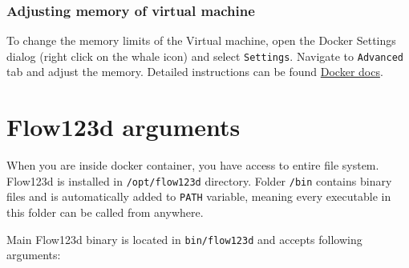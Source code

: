 \subsubsection{Adjusting memory of virtual machine}
To change the memory limits of the Virtual machine, open the Docker Settings dialog (right click on the whale icon) and select \verb'Settings'.
Navigate to \verb'Advanced' tab and adjust the memory. Detailed instructions can be found \href{https://docs.docker.com/docker-for-windows/#advanced}{Docker docs}.


\section{Flow123d arguments}
When you are inside docker container, you have access to entire file system. Flow123d is installed in
\verb'/opt/flow123d' directory. Folder \verb'/bin' contains binary files and is automatically
added to \verb'PATH' variable, meaning every executable in this folder can be called from anywhere.

Main Flow123d binary is located in \verb'bin/flow123d' and accepts following arguments:


